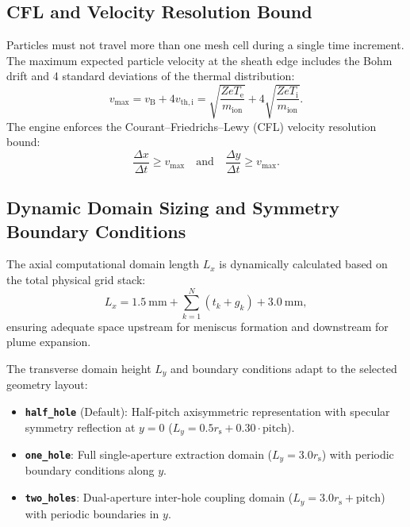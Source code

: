 \documentclass[11pt,a4paper]{article}
\begin{document}
\subsection{CFL and Velocity Resolution Bound}
Particles must not travel more than one mesh cell during a single time increment. The maximum expected particle velocity at the sheath edge includes the Bohm drift and 4 standard deviations of the thermal distribution:
\begin{equation}
    v_{\max} = v_{\mathrm{B}} + 4 v_{\mathrm{th,i}} = \sqrt{\frac{Z e T_{\mathrm{e}}}{m_{\mathrm{ion}}}} + 4\sqrt{\frac{Z e T_{\mathrm{i}}}{m_{\mathrm{ion}}}}.
\end{equation}
The engine enforces the Courant--Friedrichs--Lewy (CFL) velocity resolution bound:
\begin{equation}
    \frac{\Delta x}{\Delta t} \ge v_{\max} \quad \text{and} \quad \frac{\Delta y}{\Delta t} \ge v_{\max}.
\end{equation}

\subsection{Dynamic Domain Sizing and Symmetry Boundary Conditions}
The axial computational domain length $L_x$ is dynamically calculated based on the total physical grid stack:
\begin{equation}
    L_x = \SI{1.5}{\milli\meter} + \sum_{k=1}^{N} \left(t_k + g_k\right) + \SI{3.0}{\milli\meter},
\end{equation}
ensuring adequate space upstream for meniscus formation and downstream for plume expansion.

The transverse domain height $L_y$ and boundary conditions adapt to the selected geometry layout:
\begin{itemize}[nosep]
    \item \textbf{\texttt{half\_hole}} (Default): Half-pitch axisymmetric representation with specular symmetry reflection at $y = 0$ ($L_y = 0.5 r_{\mathrm{s}} + 0.30 \cdot \text{pitch}$).
    \item \textbf{\texttt{one\_hole}}: Full single-aperture extraction domain ($L_y = 3.0 r_{\mathrm{s}}$) with periodic boundary conditions along $y$.
    \item \textbf{\texttt{two\_holes}}: Dual-aperture inter-hole coupling domain ($L_y = 3.0 r_{\mathrm{s}} + \text{pitch}$) with periodic boundaries in $y$.
\end{itemize}

\end{document}

